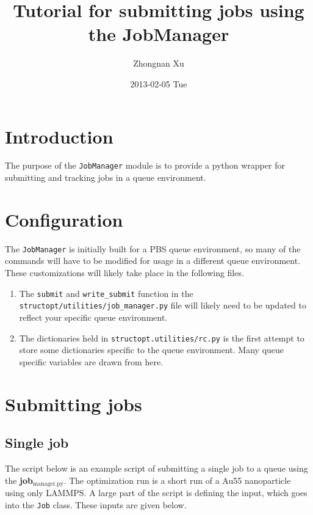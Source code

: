 \documentclass[11pt]{article}
\author{Zhongnan Xu}
\date{2013-02-05 Tue}
\title{Tutorial for submitting jobs using the JobManager}
\begin{document}
\doublespace
\maketitle
\tableofcontents

\section{Introduction}
\label{sec:orgheadline1}
The purpose of the \texttt{JobManager} module is to provide a python wrapper for submitting and tracking jobs in a queue environment.

\section{Configuration}
\label{sec:orgheadline2}
The \texttt{JobManager} is initially built for a PBS queue environment, so many of the commands will have to be modified for usage in a different queue environment. These customizations will likely take place in the following files.

\begin{enumerate}
\item The \texttt{submit} and \texttt{write\_submit} function in the \texttt{structopt/utilities/job\_manager.py} file will likely need to be updated to reflect your specific queue environment.

\item The dictionaries held in \texttt{structopt.utilities/rc.py} is the first attempt to store some dictionaries specific to the queue environment. Many queue specific variables are drawn from here.
\end{enumerate}

\section{Submitting jobs}
\label{sec:orgheadline5}
\subsection{Single job}
\label{sec:orgheadline3}
The script below is an example script of submitting a single job to a queue using the \textbf{job\(_{\text{manager.py}}\)}. The optimization run is a short run of a Au55 nanoparticle using only LAMMPS. A large part of the script is defining the input, which goes into the \texttt{Job} class. These inputs are given below.
\end{document}
